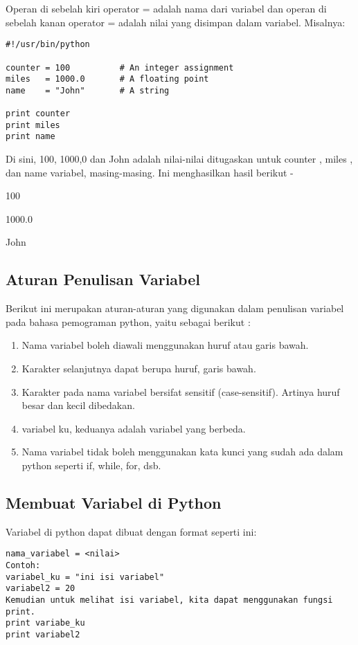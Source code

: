 Operan di sebelah kiri operator = adalah nama dari variabel dan operan di sebelah kanan operator = adalah nilai yang disimpan dalam variabel. Misalnya:

\begin{verbatim}
#!/usr/bin/python

counter = 100          # An integer assignment
miles   = 1000.0       # A floating point
name    = "John"       # A string

print counter
print miles
print name
\end{verbatim}

Di sini, 100, 1000,0 dan John adalah nilai-nilai ditugaskan untuk counter , miles , dan name variabel, masing-masing. Ini menghasilkan hasil berikut -

100

1000.0

John

\subsection{Aturan Penulisan Variabel}
Berikut ini merupakan aturan-aturan yang digunakan dalam penulisan variabel pada bahasa pemograman python, yaitu sebagai berikut :
\begin{enumerate}
	\item Nama variabel boleh diawali menggunakan huruf atau garis bawah.
	\item Karakter selanjutnya dapat berupa huruf, garis bawah.
	\item Karakter pada nama variabel bersifat sensitif (case-sensitif). Artinya huruf besar dan kecil dibedakan. 
	\item variabel ku, keduanya adalah variabel yang berbeda.
	\item Nama variabel tidak boleh menggunakan kata kunci yang sudah ada dalam python seperti if, while, for, dsb.
\end{enumerate}  

\subsection{Membuat Variabel di Python}
Variabel di python dapat dibuat dengan format seperti ini:

\begin{verbatim}
nama_variabel = <nilai>
Contoh:
variabel_ku = "ini isi variabel"
variabel2 = 20
Kemudian untuk melihat isi variabel, kita dapat menggunakan fungsi print.
print variabe_ku
print variabel2
\end{verbatim}

